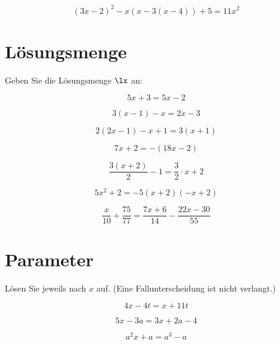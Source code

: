 {\begin{bbwAufgabenBlock}
\item $$(3x-2)^2 -x(x-3(x-4))  + 5 = 11x^2$$

\end{bbwAufgabenBlock}
\newpage


\section{Lösungsmenge}
Geben Sie die Lösungsmenge $\lx$ an:

\begin{bbwAufgabenBlock}

\item $$5x+3 = 5x-2$$
\LoesungsBlock{$\lx=\{\}$}

\item $$3(x-1)-x = 2x-3$$

\item $$2(2x-1)-x+1 = 3(x+1)$$
\LoesungsBlock{$\lx=\{\}$}

\item $$7x+2 = -(18x - 2)$$

\item $$\frac{3(x+2)}2 - 1 = \frac32 \cdot{} x + 2$$

\item $$5x^2 + 2 = -5(x+2)(-x+2)$$
\LoesungsBlock{$\lx=\{\}$}

\item $$\frac{x}{10} + \frac{75}{77} = \frac{7x+6}{14} - \frac{22x-30}{55}$$

\end{bbwAufgabenBlock}
\newpage
\section{Parameter}
Lösen Sie jeweils nach $x$ auf. (Eine Fallunterscheidung ist nicht verlangt.)
\begin{bbwAufgabenBlock}
\item $$4x-4t = x+ 11t$$

\item $$5x-3a = 3x+2a-4$$

\item $$a^2x+a = a^3 -a$$


\end{bbwAufgabenBlock}}
